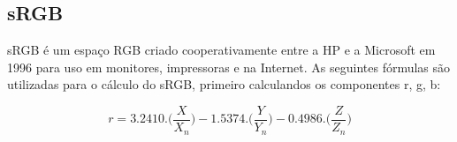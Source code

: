 \documentclass[a4paper,10pt]{report}
\begin{document}






\subsection{sRGB}
\par
sRGB é um espaço RGB criado cooperativamente entre a HP e a Microsoft em 1996
para uso em monitores, impressoras e na Internet. As seguintes fórmulas são
utilizadas para o cálculo do sRGB, primeiro calculandos os componentes r, g, b:

\begin{equation}\label{eq:sRGB_r}
r=3.2410.\Big(\frac{X}{X_n}\Big)-1.5374.\Big(\frac{Y}{Y_n}
\Big)-0.4986.\Big(\frac{Z}{Z_n}\Big)
\end{equation}
\end{document}

